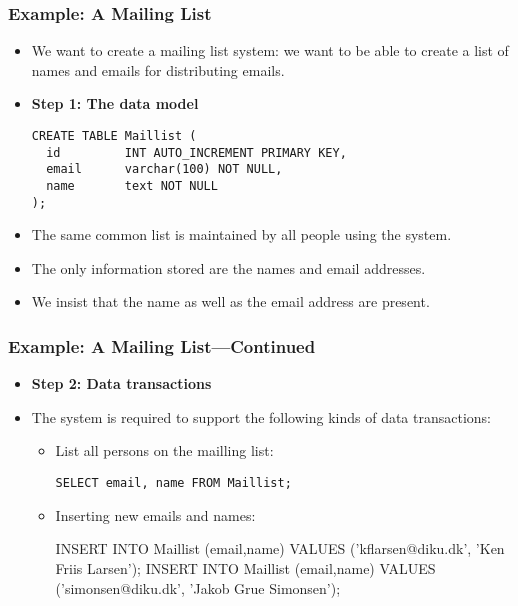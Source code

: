 \documentclass[dvipsnames]{beamer}
\begin{document}
\begin{frame}[fragile=singleslide]
\frametitle{Example: A Mailing List} 

\begin{itemize}
\item We want to create a mailing list system: we want to be able to
  create a list of names and emails for distributing emails.

\item \textbf{Step 1: The data model}

\begin{small}
\begin{verbatim}
CREATE TABLE Maillist (
  id         INT AUTO_INCREMENT PRIMARY KEY,
  email      varchar(100) NOT NULL,
  name       text NOT NULL
);
\end{verbatim}
\end{small}

\item The same common list is maintained by all people using the system.

\item The only information stored are the names and email addresses.

\item We insist that the name as well as the email address are present.
\end{itemize}
\end{frame}

\begin{frame}[fragile=singleslide]
\frametitle{Example: A Mailing List---Continued} 

\begin{itemize}
\item \textbf{Step 2: Data transactions}


\item The system is required to support the following kinds of data
  transactions:
  \begin{itemize}
  \item List all persons on the mailling list:
    \begin{small}
\begin{verbatim}
SELECT email, name FROM Maillist;
\end{verbatim}
    \end{small}
  \item Inserting new emails and names:
    \begin{small}
\begin{semiverbatim}
INSERT INTO Maillist (email,name) VALUES
  ('kflarsen@diku.dk', 'Ken Friis Larsen');
INSERT INTO Maillist (email,name) VALUES
  ('simonsen@diku.dk', 'Jakob Grue Simonsen');
\end{semiverbatim}
    \end{small}
  \end{itemize}
\end{itemize}
\end{frame}
\end{document}
